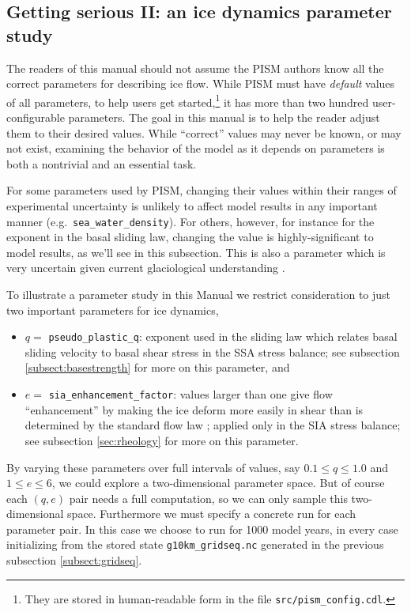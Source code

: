 \subsection{Getting serious II: an ice dynamics parameter study}  \label{subsect:paramstudy}

The readers of this manual should not assume the PISM authors know all the correct parameters for describing ice flow.  While PISM must have \emph{default} values of all parameters, to help users get started,\footnote{They are stored in human-readable form in the file \texttt{src/pism_config.cdl}.} it has more than two hundred user-configurable parameters.  The goal in this manual is to help the reader adjust them to their desired values.  While ``correct'' values may never be known, or may not exist, examining the behavior of the model as it depends on parameters is both a nontrivial and an essential task.

For some parameters used by PISM, changing their values within their ranges of experimental uncertainty is unlikely to affect model results in any important manner (e.g.~\texttt{sea_water_density}).  For others, however, for instance for the exponent in the basal sliding law, changing the value is highly-significant to model results, as we'll see in this subsection.  This is also a parameter which is very uncertain given current glaciological understanding \cite{CuffeyPaterson}.

To illustrate a parameter study in this Manual we restrict consideration to just two important parameters for ice dynamics,\begin{itemize}
\item $q=$ \texttt{pseudo_plastic_q}: exponent used in the sliding law which relates basal sliding velocity to basal shear stress in the SSA stress balance; see subsection \ref{subsect:basestrength} for more on this parameter, and
\item $e=$ \texttt{sia_enhancement_factor}: values larger than one give flow ``enhancement'' by making the ice deform more easily in shear than is determined by the standard flow law \cite{LliboutryDuval1985,PatersonBudd}; applied only in the SIA stress balance; see subsection \ref{sec:rheology} for more on this parameter.
\end{itemize}

By varying these parameters over full intervals of values, say $0.1\le q \le 1.0$ and $1 \le e \le 6$, we could explore a two-dimensional parameter space.  But of course each $(q,e)$ pair needs a full computation, so we can only sample this two-dimensional space.  Furthermore we must specify a concrete run for each parameter pair.  In this case we choose to run for 1000 model years, in every case initializing from the stored state \texttt{g10km_gridseq.nc} generated in the previous subsection \ref{subsect:gridseq}.

